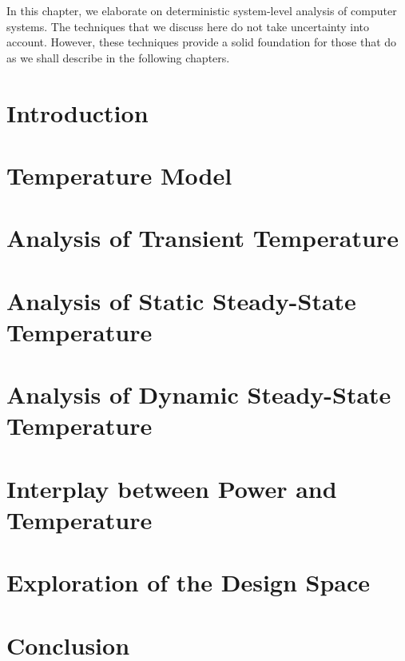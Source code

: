 In this chapter, we elaborate on deterministic system-level analysis of computer
systems. The techniques that we discuss here do not take uncertainty into
account. However, these techniques provide a solid foundation for those that do
as we shall describe in the following chapters.

\section{Introduction}

\section{Temperature Model}

\section{Analysis of Transient Temperature}

\section{Analysis of Static Steady-State Temperature}

\section{Analysis of Dynamic Steady-State Temperature}

\section{Interplay between Power and Temperature}

\section{Exploration of the Design Space}

\section{Conclusion}
